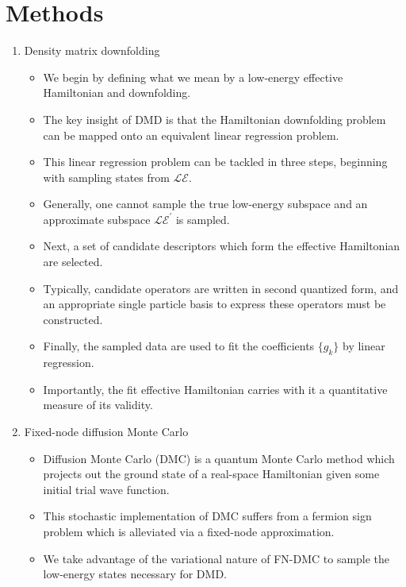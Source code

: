 \documentclass{article}
\begin{document}
\section{Methods}
\begin{enumerate}
\item Density matrix downfolding
\begin{itemize}
\item We begin by defining what we mean by a low-energy effective Hamiltonian and downfolding.

\item The key insight of DMD is that the Hamiltonian downfolding problem can be mapped onto an equivalent linear regression problem.

\item This linear regression problem can be tackled in three steps, beginning with sampling states from $\mathcal{LE}$.

\item Generally, one cannot sample the true low-energy subspace and an approximate subspace $\mathcal{LE}^\prime$ is sampled.

\item Next, a set of candidate descriptors which form the effective Hamiltonian are selected.

\item Typically, candidate operators are written in second quantized form, and an appropriate single particle basis to express these operators must be constructed.

\item Finally, the sampled data are used to fit the coefficients $\{g_k\}$ by linear regression.

\item Importantly, the fit effective Hamiltonian carries with it a quantitative measure of its validity.
\end{itemize}

\item Fixed-node diffusion Monte Carlo 
\begin{itemize}
\item Diffusion Monte Carlo (DMC) is a quantum Monte Carlo method which projects out the ground state of a real-space Hamiltonian given some initial trial wave function.

\item This stochastic implementation of DMC suffers from a fermion sign problem which is alleviated via a fixed-node approximation.

\item We take advantage of the variational nature of FN-DMC to sample the low-energy states necessary for DMD.
\end{itemize}
\end{enumerate}
\end{document}
